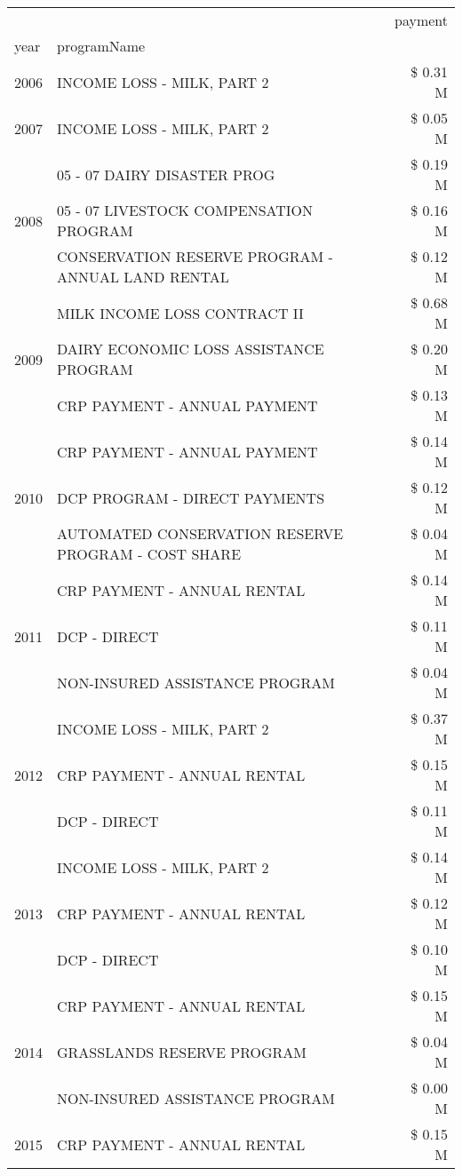 \begin{tabular}{llr}
\toprule
 &  & payment \\
year & programName &  \\
\midrule
2006 & INCOME LOSS - MILK, PART 2 & \$ 0.31 M \\
\cline{1-3}
2007 & INCOME LOSS - MILK, PART 2 & \$ 0.05 M \\
\cline{1-3}
\multirow[t]{3}{*}{2008} & 05 - 07 DAIRY DISASTER PROG & \$ 0.19 M \\
 & 05 - 07 LIVESTOCK COMPENSATION PROGRAM & \$ 0.16 M \\
 & CONSERVATION RESERVE PROGRAM - ANNUAL LAND RENTAL & \$ 0.12 M \\
\cline{1-3}
\multirow[t]{3}{*}{2009} & MILK INCOME LOSS CONTRACT II & \$ 0.68 M \\
 & DAIRY ECONOMIC LOSS ASSISTANCE PROGRAM & \$ 0.20 M \\
 & CRP PAYMENT - ANNUAL PAYMENT & \$ 0.13 M \\
\cline{1-3}
\multirow[t]{3}{*}{2010} & CRP PAYMENT - ANNUAL PAYMENT & \$ 0.14 M \\
 & DCP PROGRAM - DIRECT PAYMENTS & \$ 0.12 M \\
 & AUTOMATED CONSERVATION RESERVE PROGRAM - COST SHARE & \$ 0.04 M \\
\cline{1-3}
\multirow[t]{3}{*}{2011} & CRP PAYMENT - ANNUAL RENTAL & \$ 0.14 M \\
 & DCP - DIRECT & \$ 0.11 M \\
 & NON-INSURED ASSISTANCE PROGRAM & \$ 0.04 M \\
\cline{1-3}
\multirow[t]{3}{*}{2012} & INCOME LOSS - MILK, PART 2 & \$ 0.37 M \\
 & CRP PAYMENT - ANNUAL RENTAL & \$ 0.15 M \\
 & DCP - DIRECT & \$ 0.11 M \\
\cline{1-3}
\multirow[t]{3}{*}{2013} & INCOME LOSS - MILK, PART 2 & \$ 0.14 M \\
 & CRP PAYMENT - ANNUAL RENTAL & \$ 0.12 M \\
 & DCP - DIRECT & \$ 0.10 M \\
\cline{1-3}
\multirow[t]{3}{*}{2014} & CRP PAYMENT - ANNUAL RENTAL & \$ 0.15 M \\
 & GRASSLANDS RESERVE PROGRAM & \$ 0.04 M \\
 & NON-INSURED ASSISTANCE PROGRAM & \$ 0.00 M \\
\cline{1-3}
\multirow[t]{3}{*}{2015} & CRP PAYMENT - ANNUAL RENTAL & \$ 0.15 M \\

\end{tabular}
